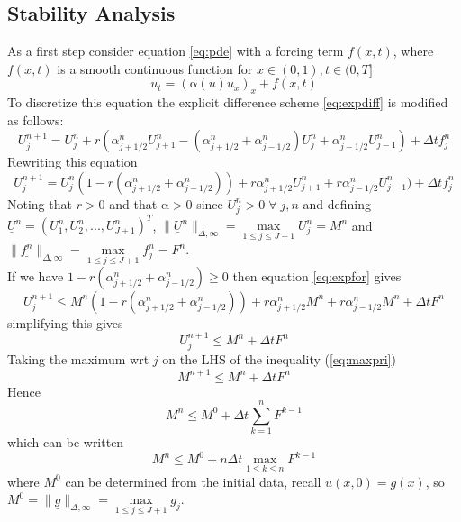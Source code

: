 \documentclass[11pt]{article}
\newcommand{\D}{\Delta}
\newcommand{\al}{\mathrm{\alpha}}
\begin{document}
\subsection{Stability Analysis}
As a first step consider equation \ref{eq:pde} with a forcing term $f(x,t)$, where $f(x,t)$ is a smooth continuous function for $x \in (0,1), t\in (0,T]$
\begin{equation}
\label{eq:pdefor}
u_t = (\al(u)u_x)_x+f(x,t)
\end{equation}
To discretize this equation the explicit difference scheme \ref{eq:expdiff} is modified as follows:
\begin{equation*}
U_j^{n+1} = U_j^n + r(\alpha_{j+1/2}^nU_{j+1}^n - (\alpha_{j+1/2}^n+\alpha_{j-1/2}^n)U_j^n+\alpha_{j-1/2}^nU_{j-1}^n) + \D{t}f_j^n
\end{equation*}
Rewriting this equation
\begin{equation}
\label{eq:expfor}
U_j^{n+1} = U_j^n(1 - r(\alpha_{j+1/2}^n+\alpha_{j-1/2}^n)) + r\alpha_{j+1/2}^nU_{j+1}^n +r\alpha_{j-1/2}^nU_{j-1}^n) + \D{t}f_j^n 
\end{equation}
 Noting that $r > 0$ and that ${\al}> 0 $ 
 since $U_j^n > 0\;\forall \;j, n $ and defining  $\underline{U}^n={(U_1^n,U_2^n,...,U_{J+1}^n)}^T$, $\|{\underline{U}^n}\|_{\D,\infty} = \max\limits_{1\leq{j}\leq{J+1}   }{U_j^n} = M^n $ and
$ \|{\underline{f^n}\|_{\D,\infty}} = \max\limits_{1\leq{j}\leq{J+1}   }{f_j^n} = F^n $.\\
If we have $1 - r(\alpha_{j+1/2}^n+\alpha_{j-1/2}^n) \geq 0$ then equation \ref{eq:expfor} gives
\begin{equation*}
U_j^{n+1} \leq M^n(1 - r(\alpha_{j+1/2}^n+\alpha_{j-1/2}^n)) + r\alpha_{j+1/2}^nM^n +r\alpha_{j-1/2}^nM^n + \D{t}F^n 
\end{equation*}
simplifying this gives 
\begin{equation}
\label{eq:maxpri}
U_j^{n+1} \leq M^n + \D{t}F^n 
\end{equation}
Taking the maximum wrt $j$ on the LHS of the inequality (\ref{eq:maxpri})
\begin{equation*}
M^{n+1} \leq M^n + \D{t}F^n
\end{equation*}
Hence
\begin{equation*}
M^n \leq M^0 + \D{t}\sum_{k=1}^n{F^{k-1}}
\end{equation*}
which can be written
\begin{equation}
\label{eq:expsta}
M^n \leq M^0 + n\D{t}\max_{1\leq{k}\leq{n}}{F^{k-1}}
\end{equation}
where $M^0$ can be determined from the initial data, recall $u(x,0) = g(x)$, so\\ $M^0 = \|\underline{g}\|_{\D,\infty} = \max\limits_{1\leq{j}\leq{J+1}}g_j$.\\
\end{document}
